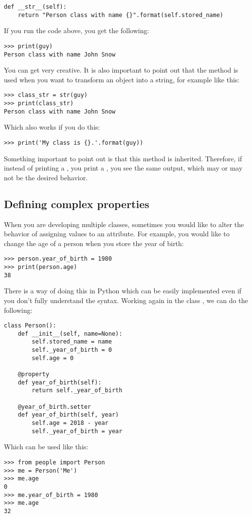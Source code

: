 \begin{verbatim}
def __str__(self):
    return "Person class with name {}".format(self.stored_name)
\end{verbatim}

If you run the code above, you get the following:
\begin{verbatim}
>>> print(guy)
Person class with name John Snow
\end{verbatim}

You can get very creative. It is also important to point out that the method  is used when you want to transform an object into a string, for example like this:

\begin{verbatim}
>>> class_str = str(guy)
>>> print(class_str)
Person class with name John Snow
\end{verbatim}

Which also works if you do this:

\begin{verbatim}
>>> print('My class is {}.'.format(guy))
\end{verbatim}

Something important to point out is that this method is inherited. Therefore, if instead of printing a , you print a , you see the same output, which may or may not be the desired behavior.

\subsection{Defining complex properties}\label{subsec:defining-complex-properties}
When you are developing multiple classes, sometimes you would like to alter the behavior of assigning values to an attribute. For example, you would like to change the age of a person when you store the year of birth:
\begin{verbatim}
>>> person.year_of_birth = 1980
>>> print(person.age)
38
\end{verbatim}

There is a way of doing this in Python which can be easily implemented even if you don't fully understand the syntax. Working again in the class , we can do the following:
\begin{verbatim}
class Person():
    def __init__(self, name=None):
        self.stored_name = name
        self._year_of_birth = 0
        self.age = 0

    @property
    def year_of_birth(self):
        return self._year_of_birth

    @year_of_birth.setter
    def year_of_birth(self, year)
        self.age = 2018 - year
        self._year_of_birth = year
\end{verbatim}
Which can be used like this:
\begin{verbatim}
>>> from people import Person
>>> me = Person('Me')
>>> me.age
0
>>> me.year_of_birth = 1980
>>> me.age
32
\end{verbatim}

